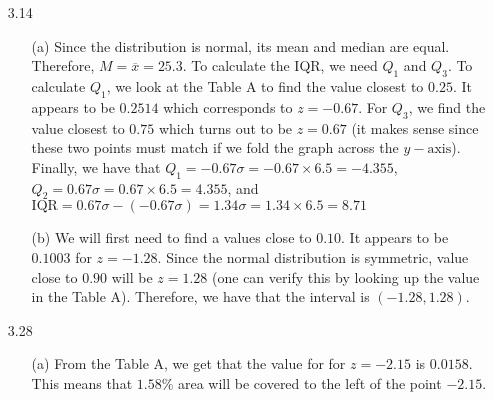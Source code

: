 \documentclass[11pt, a4paper]{article}
\newcommand\und[1]{\underline{\smash{#1}}}
\begin{document}
\begin{itemize}
\item[]
\item[]

\item[3.14]
\begin{itemize}
\item[(a)]
Since the distribution is normal, its mean and median are equal.
Therefore, $M = \overline{x} = 25.3$. To calculate the IQR,
we need $Q_1$ and $Q_3$. To calculate $Q_1$, we look at
the Table A to find the value closest to $0.25$. It
appears to be $0.2514$ which corresponds to $z = -0.67$.
For $Q_3$, we find the value closest to $0.75$ which
turns out to be $z = 0.67$ (it makes sense since
these two points must match if we fold the graph
across the $y - \text{axis}$). Finally, we have
that $Q_1 = -0.67\sigma = -0.67 \times 6.5 = -4.355$,
$Q_2 = 0.67\sigma = 0.67 \times 6.5 = 4.355$, and $\text{IQR} = 0.67\sigma - (-0.67\sigma) = 1.34\sigma = 1.34 \times 6.5 = 8.71$

\item[]

\item[(b)]
We will first need to find a values close to $0.10$. It appears
to be $0.1003$ for $z = -1.28$. Since the normal distribution
is \und{perfectly} symmetric, value close to $0.90$ will be
$z = 1.28$ (one can verify this by looking up the value in the Table A). Therefore, we have that the interval is $(-1.28, 1.28)$.
\end{itemize}

\item[]
\item[]

\item[3.28]
\begin{itemize}

\item[(a)]
From the Table A, we get that the value for for $z = -2.15$ is $0.0158$.
This means that $1.58\%$ area will be covered to the left of the
point $-2.15$.
\item[]
\item[]
\item[]


\end{itemize}
\end{itemize}
\end{document}
